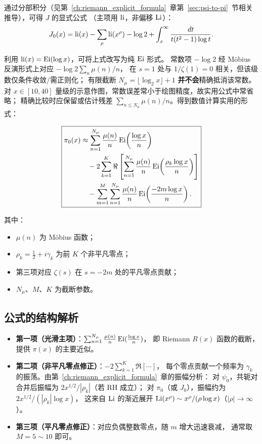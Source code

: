 通过分部积分（见第~\ref{ch:riemann_explicit_formula}~章第~\ref{sec:psi-to-pi}~节相关推导），可得 $J$ 的显式公式
（主项用 $\operatorname{li}$，非偏移 $\operatorname{Li}$）：
\begin{equation}
  J_0(x) = \operatorname{li}(x) - \sum_{\rho} \operatorname{li}(x^{\rho}) - \log 2 + \int_x^\infty \frac{dt}{t(t^2-1)\log t}.
  \label{eq:explicit_J_chap15}
\end{equation}

利用 $\operatorname{li}(x) = \operatorname{Ei}(\log x)$，可将上式改写为纯 $\operatorname{Ei}$ 形式。
常数项 $-\log 2$ 经 Möbius 反演形式上对应 $-\log 2\sum_n\mu(n)/n$，
在 $s=1$ 处与 $1/\zeta(1)=0$ 相关，但该级数仅条件收敛/需正则化；
有限截断 $N_\mu=\lfloor\log_2 x\rfloor+1$ \textbf{并不会}精确抵消该常数。
对 $x\in[10,40]$ 量级的示意作图，常数误差常小于绘图精度，故实用公式中常省略；
精确比较时应保留或估计残差 $\sum_{n\le N_\mu}\mu(n)/n$。得到数值计算实用的形式：

\begin{equation}\label{eq:pi_explicit_full}
\boxed{\begin{aligned}
\pi_0(x) &\approx \sum_{n=1}^{N_{\mu}} \frac{\mu(n)}{n} \operatorname{Ei}\!\left(\frac{\log x}{n}\right) \\
&\quad - 2\sum_{k=1}^{K} \Re \left[ \sum_{n=1}^{N_{\mu}} \frac{\mu(n)}{n} \operatorname{Ei}\!\left(\frac{\rho_k \log x}{n}\right) \right] \\
&\quad - \sum_{m=1}^{M} \sum_{n=1}^{N_{\mu}} \frac{\mu(n)}{n} \operatorname{Ei}\!\left(\frac{-2m \log x}{n}\right).
\end{aligned}}
\end{equation}

其中：
\begin{itemize}
  \item $\mu(n)$ 为 Möbius 函数；
  \item $\rho_k = \frac12 + i\gamma_k$ 为前 $K$ 个非平凡零点；
  \item 第三项对应 $\zeta(s)$ 在 $s=-2m$ 处的平凡零点贡献；
  \item $N_{\mu}$、$M$、$K$ 为截断参数。
\end{itemize}

\subsection{公式的结构解析}

\begin{itemize}
  \item \textbf{第一项（光滑主项）}：$\sum_{n=1}^{N_{\mu}} \frac{\mu(n)}{n} \operatorname{Ei}(\frac{\log x}{n})$，
        即 Riemann $R(x)$ 函数的截断，提供 $\pi(x)$ 的主要近似。
  \item \textbf{第二项（非平凡零点修正）}：$-2\sum_{k=1}^{K}\Re[\cdots]$，
        每个零点贡献一个频率为 $\gamma_k$ 的振荡。由第~\ref{ch:riemann_explicit_formula}~章的振幅分析：
        对 $\psi_0$，共轭对合并后振幅为 $2x^{1/2}/|\rho_k|$（若 RH 成立）；
        对 $\pi_0$（或 $J_0$），振幅约为 $2x^{1/2}/(|\rho_k|\log x)$，
        这来自 $\operatorname{Li}$ 的渐近展开 $\operatorname{Li}(x^\rho)\sim x^\rho/(\rho\log x)$（$|\rho|\to\infty$）。
  \item \textbf{第三项（平凡零点修正）}：对应负偶整数零点，随 $m$ 增大迅速衰减，
        通常取 $M=5\sim10$ 即可。
\end{itemize}

